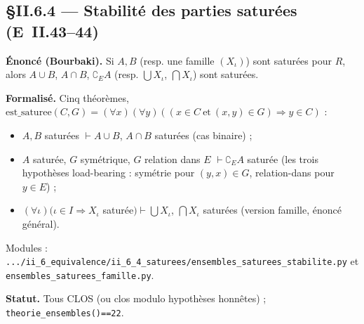 \subsection{§II.6.4 --- Stabilité des parties saturées (E~II.43--44)}
\textbf{Énoncé (Bourbaki).} Si $A,B$ (resp. une famille $(X_\iota)$) sont saturées pour
$R$, alors $A\cup B$, $A\cap B$, $\complement_E A$ (resp. $\bigcup X_\iota$,
$\bigcap X_\iota$) sont saturées.

\textbf{Formalisé.} Cinq théorèmes, $\mathrm{est\_saturee}(C,G)=(\forall x)(\forall y)
((x\in C\ \text{et}\ (x,y)\in G)\Rightarrow y\in C)$ :
\begin{itemize}
  \item $A,B$ saturées $\vdash A\cup B$, $A\cap B$ saturées (cas binaire) ;
  \item $A$ saturée, $G$ symétrique, $G$ relation dans $E$ $\vdash \complement_E A$ saturée
        (les trois hypothèses load-bearing : symétrie pour $(y,x)\in G$, relation-dans pour $y\in E$) ;
  \item $(\forall\iota)(\iota\in I\Rightarrow X_\iota$ saturée$)\vdash\bigcup X_\iota$,
        $\bigcap X_\iota$ saturées (version famille, énoncé général).
\end{itemize}
Modules : \texttt{.../ii\_6\_equivalence/ii\_6\_4\_saturees/ensembles\_saturees\_stabilite.py}
et \texttt{ensembles\_saturees\_famille.py}.

\textbf{Statut.} Tous CLOS (ou clos modulo hypothèses honnêtes) ; \texttt{theorie\_ensembles()==22}.
